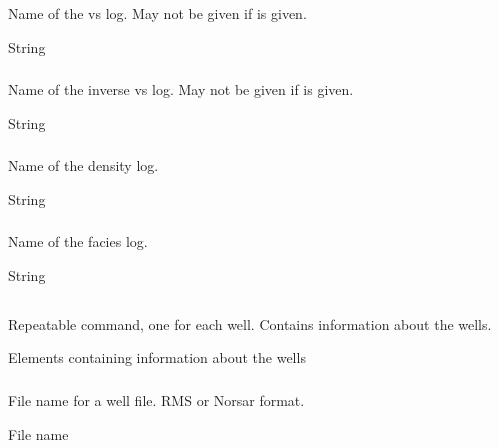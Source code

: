 \subsubsection{}
 \slist
   \item \Description Name of the vs log. May not be given if  is given.
   \item \Argument String
   \item \Default
 \elist

\subsubsection{}
 \slist
   \item \Description Name of the inverse vs log. May not be given if  is given.
   \item \Argument String
   \item \Default %
 \elist

\subsubsection{}
 \slist
   \item \Description Name of the density log.
   \item \Argument String
   \item \Default %
 \elist

\subsubsection{}
 \slist
   \item \Description Name of the facies log.
   \item \Argument String
   \item \Default %
 \elist

\subsection{}
 \slist
   \item \Description Repeatable command, one for each well. Contains information about the wells.
   \item \Argument Elements containing information about the wells
   \item \Default
 \elist

\subsubsection{}
 \slist
   \item \Description File name for a well file. RMS or Norsar format.
   \item \Argument File name
   \item \Default
 \elist


